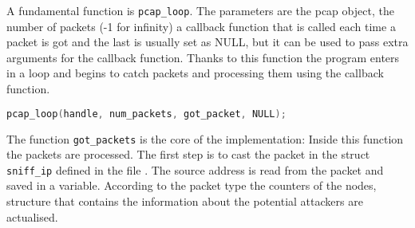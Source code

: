 A fundamental function is \lstinline|pcap_loop|.
The parameters are the pcap object,
the number of packets (-1 for infinity) a callback function that is called each time a packet
is got and the last is usually set as NULL, but it can be used to pass extra arguments for the
callback function.
Thanks to this function the program enters in a loop and begins to catch packets and processing them using the callback function.
\begin{lstlisting}[frame= single, language=C, caption=Pcap functions called to start getting the packets on the network.]
pcap_loop(handle, num_packets, got_packet, NULL);
\end{lstlisting}
The function \lstinline|got_packets| is the core of the implementation: Inside this function the packets are processed.
The first step is to cast the packet in the struct \lstinline|sniff_ip| defined in the file .
The source address is read from the packet and saved in a variable. According to the packet type the counters of the 
nodes, structure that contains the information about the potential attackers are actualised.

